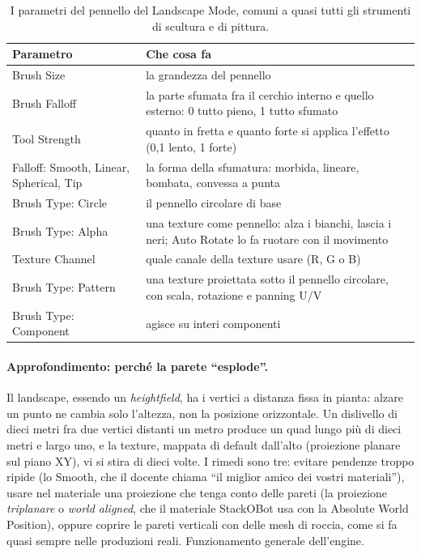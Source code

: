 \begin{table}[htbp]
\centering
\small
\begin{tabular}{@{}p{3.6cm}p{10.4cm}@{}}
\toprule
\textbf{Parametro} & \textbf{Che cosa fa} \\
\midrule
Brush Size & la grandezza del pennello \\
Brush Falloff & la parte sfumata fra il cerchio interno e quello esterno: 0 tutto pieno, 1
tutto sfumato \\
Tool Strength & quanto in fretta e quanto forte si applica l'effetto (0,1 lento, 1 forte) \\
Falloff: Smooth, Linear, Spherical, Tip & la forma della sfumatura: morbida, lineare,
bombata, convessa a punta \\
Brush Type: Circle & il pennello circolare di base \\
Brush Type: Alpha & una texture come pennello: alza i bianchi, lascia i neri; Auto Rotate
lo fa ruotare con il movimento \\
Texture Channel & quale canale della texture usare (R, G o B) \\
Brush Type: Pattern & una texture proiettata sotto il pennello circolare, con scala,
rotazione e panning U/V \\
Brush Type: Component & agisce su interi componenti \\
\bottomrule
\end{tabular}
\caption{I parametri del pennello del Landscape Mode, comuni a quasi tutti gli
strumenti di scultura e di pittura.}
\label{ue14:tab:pennello}
\end{table}

\paragraph{Approfondimento: perché la parete ``esplode''.} Il landscape, essendo un
\emph{heightfield}, ha i vertici a distanza fissa in pianta: alzare un punto ne cambia solo
l'altezza, non la posizione orizzontale. Un dislivello di dieci metri fra due vertici
distanti un metro produce un quad lungo più di dieci metri e largo uno, e la texture,
mappata di default dall'alto (proiezione planare sul piano XY), vi si stira di dieci volte.
I rimedi sono tre: evitare pendenze troppo ripide (lo Smooth, che il docente chiama ``il
miglior amico dei vostri materiali''), usare nel materiale una proiezione che tenga conto
delle pareti (la proiezione \emph{triplanare} o \emph{world aligned}, che il materiale
StackOBot usa con la Absolute World Position), oppure coprire le pareti verticali con
delle mesh di roccia, come si fa quasi sempre nelle produzioni reali. Funzionamento
generale dell'engine.

